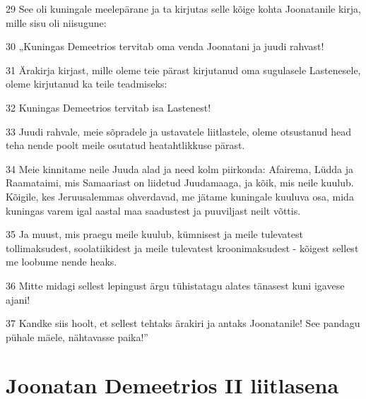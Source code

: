 \par 29 See oli kuningale meelepärane ja ta kirjutas selle kõige kohta Joonatanile kirja, mille sisu oli niisugune:
\par 30 „Kuningas Demeetrios tervitab oma venda Joonatani ja juudi rahvast!
\par 31 Ärakirja kirjast, mille oleme teie pärast kirjutanud oma sugulasele Lastenesele, oleme kirjutanud ka teile teadmiseks:
\par 32 Kuningas Demeetrios tervitab isa Lastenest!
\par 33 Juudi rahvale, meie sõpradele ja ustavatele liitlastele, oleme otsustanud head teha nende poolt meile osutatud heatahtlikkuse pärast.
\par 34 Meie kinnitame neile Juuda alad ja need kolm piirkonda: Afairema, Lüdda ja Raamataimi, mis Samaariast on liidetud Juudamaaga, ja kõik, mis neile kuulub. Kõigile, kes Jeruusalemmas ohverdavad, me jätame kuningale kuuluva osa, mida kuningas varem igal aastal maa saadustest ja puuviljast neilt võttis.
\par 35 Ja muust, mis praegu meile kuulub, kümnisest ja meile tulevatest tollimaksudest, soolatiikidest ja meile tulevatest kroonimaksudest - kõigest sellest me loobume nende heaks.
\par 36 Mitte midagi sellest lepingust ärgu tühistatagu alates tänasest kuni igavese ajani!
\par 37 Kandke siis hoolt, et sellest tehtaks ärakiri ja antaks Joonatanile! See pandagu pühale mäele, nähtavasse paika!” 

\section*{Joonatan Demeetrios II liitlasena}

